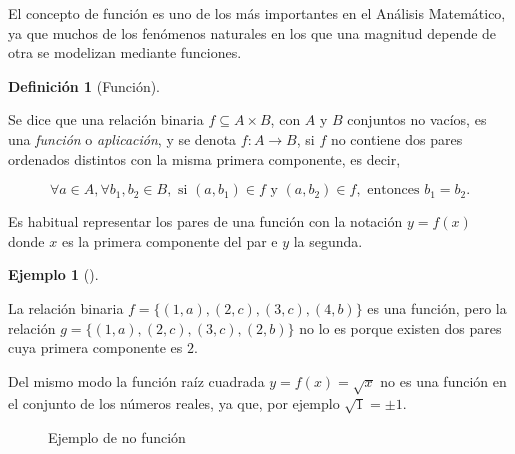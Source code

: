 \documentclass[
  a4paper,
]{scrreport}
\theoremstyle{plain}
\theoremstyle{plain}
\theoremstyle{definition}
\newtheorem{definition}{Definición}[chapter]
\theoremstyle{definition}
\newtheorem{example}{Ejemplo}[chapter]
\theoremstyle{plain}
\theoremstyle{remark}
\begin{document}
El concepto de función es uno de los más importantes en el Análisis
Matemático, ya que muchos de los fenómenos naturales en los que una
magnitud depende de otra se modelizan mediante funciones.

\begin{definition}[Función]\protect\hypertarget{def-funcion}{}\label{def-funcion}

Se dice que una relación binaria \(f \subseteq A \times B\), con \(A\) y
\(B\) conjuntos no vacíos, es una \emph{función} o \emph{aplicación}, y
se denota \(f:A\rightarrow B\), si \(f\) no contiene dos pares ordenados
distintos con la misma primera componente, es decir,

\[\forall a \in A, \forall b_1, b_2 \in B, \mbox{ si } (a,b_1) \in f \mbox{ y } (a,b_2) \in f, \mbox{ entonces } b_1 = b_2.\]

\end{definition}

Es habitual representar los pares de una función con la notación
\(y=f(x)\) donde \(x\) es la primera componente del par e \(y\) la
segunda.

\begin{example}[]\protect\hypertarget{exm-funcion}{}\label{exm-funcion}

La relación binaria \(f=\{(1,a), (2,c), (3,c), (4,b)\}\) es una función,
pero la relación \(g=\{(1,a), (2,c), (3,c), (2,b)\}\) no lo es porque
existen dos pares cuya primera componente es \(2\).

Del mismo modo la función raíz cuadrada \(y=f(x)=\sqrt{x}\) no es una
función en el conjunto de los números reales, ya que, por ejemplo
\(\sqrt{1}=\pm 1\).

\end{example}

\begin{figure}

\begin{minipage}[t]{0.50\linewidth}

{\centering 

\raisebox{-\height}{



}

\caption{Ejemplo de función}

}

\end{minipage}%
%
\begin{minipage}[t]{0.50\linewidth}

{\centering 

\raisebox{-\height}{



}

\caption{Ejemplo de no función}

}

\end{minipage}%

\end{figure}
\end{document}
